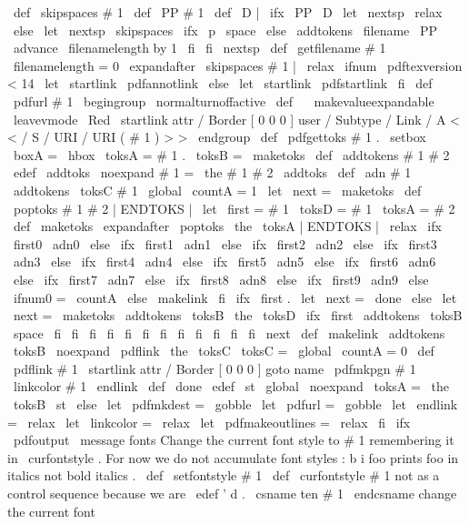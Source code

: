 %
\
def
\
skipspaces
#
1
{
\
def
\
PP
{
#
1
}
\
def
\
D
{
|
}
%
\
ifx
\
PP
\
D
\
let
\
nextsp
\
relax
\
else
\
let
\
nextsp
\
skipspaces
\
ifx
\
p
\
space
\
else
\
addtokens
{
\
filename
}
{
\
PP
}
%
\
advance
\
filenamelength
by
1
\
fi
\
fi
\
nextsp
}
\
def
\
getfilename
#
1
{
\
filenamelength
=
0
\
expandafter
\
skipspaces
#
1
|
\
relax
}
\
ifnum
\
pdftexversion
<
14
\
let
\
startlink
\
pdfannotlink
\
else
\
let
\
startlink
\
pdfstartlink
\
fi
\
def
\
pdfurl
#
1
{
%
\
begingroup
\
normalturnoffactive
\
def
\
{
}
%
\
makevalueexpandable
\
leavevmode
\
Red
\
startlink
attr
{
/
Border
[
0
0
0
]
}
%
user
{
/
Subtype
/
Link
/
A
<
<
/
S
/
URI
/
URI
(
#
1
)
>
>
}
%
\
endgroup
}
\
def
\
pdfgettoks
#
1
.
{
\
setbox
\
boxA
=
\
hbox
{
\
toksA
=
{
#
1
.
}
\
toksB
=
{
}
\
maketoks
}
}
\
def
\
addtokens
#
1
#
2
{
\
edef
\
addtoks
{
\
noexpand
#
1
=
{
\
the
#
1
#
2
}
}
\
addtoks
}
\
def
\
adn
#
1
{
\
addtokens
{
\
toksC
}
{
#
1
}
\
global
\
countA
=
1
\
let
\
next
=
\
maketoks
}
\
def
\
poptoks
#
1
#
2
|
ENDTOKS
|
{
\
let
\
first
=
#
1
\
toksD
=
{
#
1
}
\
toksA
=
{
#
2
}
}
\
def
\
maketoks
{
%
\
expandafter
\
poptoks
\
the
\
toksA
|
ENDTOKS
|
\
relax
\
ifx
\
first0
\
adn0
\
else
\
ifx
\
first1
\
adn1
\
else
\
ifx
\
first2
\
adn2
\
else
\
ifx
\
first3
\
adn3
\
else
\
ifx
\
first4
\
adn4
\
else
\
ifx
\
first5
\
adn5
\
else
\
ifx
\
first6
\
adn6
\
else
\
ifx
\
first7
\
adn7
\
else
\
ifx
\
first8
\
adn8
\
else
\
ifx
\
first9
\
adn9
\
else
\
ifnum0
=
\
countA
\
else
\
makelink
\
fi
\
ifx
\
first
.
\
let
\
next
=
\
done
\
else
\
let
\
next
=
\
maketoks
\
addtokens
{
\
toksB
}
{
\
the
\
toksD
}
\
ifx
\
first
\
addtokens
{
\
toksB
}
{
\
space
}
\
fi
\
fi
\
fi
\
fi
\
fi
\
fi
\
fi
\
fi
\
fi
\
fi
\
fi
\
fi
\
next
}
\
def
\
makelink
{
\
addtokens
{
\
toksB
}
%
{
\
noexpand
\
pdflink
{
\
the
\
toksC
}
}
\
toksC
=
{
}
\
global
\
countA
=
0
}
\
def
\
pdflink
#
1
{
%
\
startlink
attr
{
/
Border
[
0
0
0
]
}
goto
name
{
\
pdfmkpgn
{
#
1
}
}
\
linkcolor
#
1
\
endlink
}
\
def
\
done
{
\
edef
\
st
{
\
global
\
noexpand
\
toksA
=
{
\
the
\
toksB
}
}
\
st
}
\
else
\
let
\
pdfmkdest
=
\
gobble
\
let
\
pdfurl
=
\
gobble
\
let
\
endlink
=
\
relax
\
let
\
linkcolor
=
\
relax
\
let
\
pdfmakeoutlines
=
\
relax
\
fi
%
\
ifx
\
pdfoutput
\
message
{
fonts
}
%
Change
the
current
font
style
to
#
1
remembering
it
in
\
curfontstyle
.
%
For
now
we
do
not
accumulate
font
styles
:
b
{
i
{
foo
}
}
prints
foo
in
%
italics
not
bold
italics
.
%
\
def
\
setfontstyle
#
1
{
%
\
def
\
curfontstyle
{
#
1
}
%
not
as
a
control
sequence
because
we
are
\
edef
'
d
.
\
csname
ten
#
1
\
endcsname
%
change
the
current
font
}
